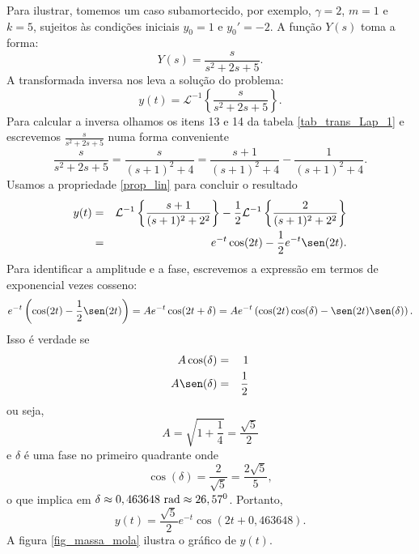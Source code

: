 Para ilustrar, tomemos um caso subamortecido, por exemplo, $\gamma=2$, $m=1$ e $k=5$, sujeitos às condições iniciais $y_0=1$ e $y_0'=-2$. A função $Y(s)$ toma a forma: 
\begin{equation}
Y(s)=\frac{s}{s^2+2 s +5}.
\end{equation}
A transformada inversa nos leva a solução do problema:
\begin{equation}
y(t)=\mathcal{L}^{-1}\left\{\frac{s}{s^2+2 s +5}\right\}.
\end{equation}
Para calcular a inversa olhamos os itens 13 e 14 da tabela \ref{tab_trans_Lap_1} e escrevemos $\frac{s}{s^2+2 s +5}$ numa forma conveniente
\begin{equation}
\frac{s}{s^2+2 s +5}=\frac{s}{(s+1)^2 +4}=\frac{s+1}{(s+1)^2 +4}-\frac{1}{(s+1)^2 +4}.
\end{equation}
Usamos a propriedade \ref{prop_lin} para concluir o resultado
\begin{eqnarray*}
y(t)&=&\mathcal{L}^{-1}\left\{\frac{s+1}{(s+1)^2 +2^2}\right\}-\frac{1}{2}\mathcal{L}^{-1}\left\{\frac{2}{(s+1)^2 +2^2}\right\}\\
&=&e^{-t}\cos(2t)-\frac{1}{2}e^{-t}\sen(2t).
\end{eqnarray*}
Para identificar a amplitude e a fase, escrevemos a expressão em termos de exponencial vezes cosseno:
\begin{equation}
e^{-t}\left(\cos(2t)-\frac{1}{2}\sen(2t)\right)=Ae^{-t}\cos(2t+\delta)=Ae^{-t}\left(\cos(2t)\cos(\delta)-\sen(2t)\sen(\delta)\right).
\end{equation}
Isso é verdade se
\begin{eqnarray*}
A\cos(\delta)&=&1\\
A\sen(\delta)&=&\frac{1}{2}
\end{eqnarray*}
ou seja,
\begin{equation}
A=\sqrt{1+\frac{1}{4}}=\frac{\sqrt{5}}{2}
\end{equation}
e $\delta$ é uma fase no primeiro quadrante onde
\begin{equation}
\cos(\delta)=\frac{2}{\sqrt{5}}=\frac{2\sqrt{5}}{5},
\end{equation}
o que implica em $\delta\approx 0,463648\ \hbox{rad} \approx 26,57^0$. Portanto,
\begin{equation}
y(t)=\frac{\sqrt{5}}{2}e^{-t}\cos(2t+0,463648).
\end{equation}
A figura \ref{fig_massa_mola} ilustra o gráfico de $y(t)$.
